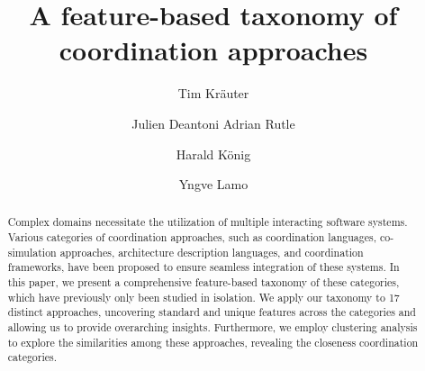 \documentclass[runningheads]{llncs}
\begin{document}
\title{A feature-based taxonomy of coordination approaches}

\author{Tim Kr\"{a}uter \and
Julien Deantoni
Adrian Rutle \and
Harald K\"{o}nig \and
Yngve Lamo}
%
%
\maketitle

\begin{abstract}

Complex domains necessitate the utilization of multiple interacting software systems.
Various categories of coordination approaches, such as coordination languages, co-simulation approaches, architecture description languages, and coordination frameworks, have been proposed to ensure seamless integration of these systems.
In this paper, we present a comprehensive feature-based taxonomy of these categories, which have previously only been studied in isolation.
We apply our taxonomy to 17 distinct approaches, uncovering standard and unique features across the categories and allowing us to provide overarching insights.
Furthermore, we employ clustering analysis to explore the similarities among these approaches, revealing the closeness coordination categories.
\end{abstract}

\end{document}
